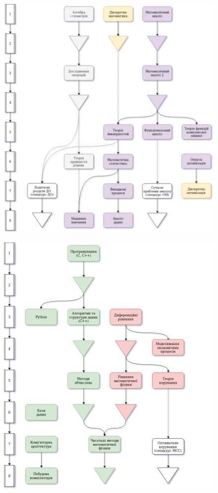 \documentclass[14pt, a4paper]{extarticle}  %
\begin{document}
\begin{figure}[ht]
\centering
\includegraphics[scale=0.57]{CourseworkTree_1.png}
\end{figure}


\begin{figure}[ht]
\centering
\includegraphics[scale=0.57]{CourseworkTree_2.png}
\end{figure}
\end{document}
